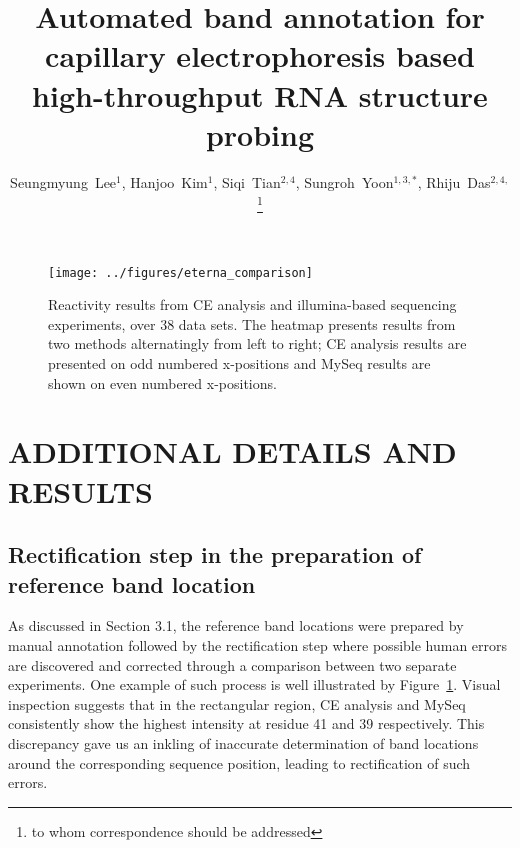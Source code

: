 \documentclass[letter]{bioinfo}
\begin{document}

\title[Automated band annotation for capillary electrophoresis]{Automated band annotation for capillary electrophoresis based high-throughput RNA structure probing}
\author[Lee \textit{et~al}]
{
Seungmyung~Lee$^{1}$,
Hanjoo~Kim$^{1}$,
Siqi~Tian$^{2,4}$,
Sungroh~Yoon$^{1,3,*}$,
Rhiju~Das$^{2,4,}$\footnote{to whom correspondence should be addressed}
}
\address{
$^{1}$Department of ECE, Seoul National University, Seoul 151-744, Korea, 
$^{2}$School of Medicine, Stanford, CA 94305, USA,
$^{3}$Interdisciplinary program in Bionformatics, Seoul National University, Seoul 151-744, Korea,
$^{4}$Departments of Biochemistry and Physics, Stanford, CA 94305, USA
}

\history{}


\maketitle



\begin{figure}
\centering
\texttt{[image: ../figures/eterna\_comparison]}
\caption{Reactivity results from CE analysis and illumina-based sequencing experiments, over 38 data sets. The heatmap presents results from two methods alternatingly from left to right; CE analysis results are presented on odd numbered x-positions and MySeq results are shown on even numbered x-positions.}
\label{f:eterna_comparison}
\end{figure}

\section{ADDITIONAL DETAILS AND RESULTS}

\subsection{ Rectification step in the preparation of reference band location }
As discussed in Section 3.1, the reference band locations were prepared by manual annotation followed by the rectification step where possible human errors are discovered and corrected through a comparison between two separate experiments. One example of such process is well illustrated by Figure~\ref{f:eterna_comparison}. Visual inspection suggests that in the rectangular region, CE analysis and MySeq consistently show the highest intensity at residue 41 and 39 respectively. This discrepancy gave us an inkling of inaccurate determination of band locations around the corresponding sequence position, leading to rectification of such errors.
\end{document}
